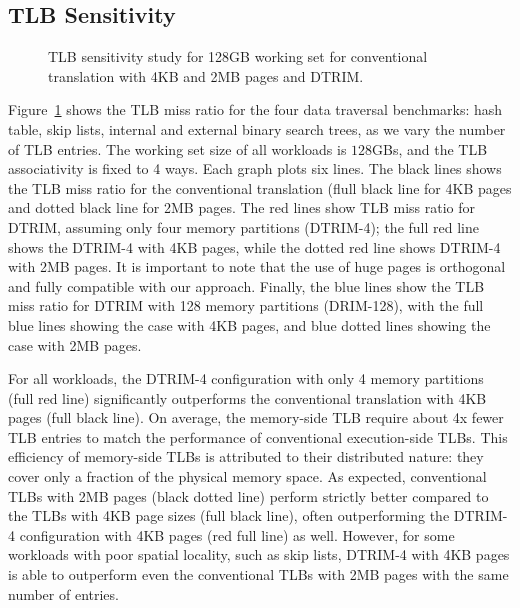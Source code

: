 \subsection{TLB Sensitivity}
\begin{figure}[t]
    \centering
    \caption{TLB sensitivity study for 128GB working set for conventional translation with 4KB and 2MB pages and DTRIM.}
    \label{fig:miss_ratio_128GB}
\end{figure}
Figure~\ref{fig:miss_ratio_128GB} shows the TLB miss ratio for the four data traversal benchmarks: hash table, skip lists, internal and external binary search trees, as we vary the number of TLB entries. The working set size of all workloads is $128$GBs, and the TLB associativity is fixed to 4 ways. Each graph plots six lines. The black lines shows the TLB miss ratio for the conventional translation (flull black line for 4KB pages and dotted black line for 2MB pages. The red lines show TLB miss ratio for DTRIM, assuming only four memory partitions (DTRIM-4); the full red line shows the DTRIM-4 with 4KB pages, while the dotted red line shows DTRIM-4 with 2MB pages. It is important to note that the use of huge pages is orthogonal and fully compatible with our approach. Finally, the blue lines show the TLB miss ratio for DTRIM with 128 memory partitions (DRIM-128), with the full blue lines showing the case with 4KB pages, and blue dotted lines showing the case with 2MB pages. 

For all workloads, the DTRIM-4 configuration with only 4 memory partitions (full red line) significantly outperforms the conventional translation with 4KB pages (full black line). On average, the memory-side TLB require about 4x fewer TLB entries to match the performance of conventional execution-side TLBs. This efficiency of memory-side TLBs is attributed to their distributed nature: they cover only a fraction of the physical memory space. As expected, conventional TLBs with 2MB pages (black dotted line) perform strictly better compared to the TLBs with 4KB page sizes (full black line), often outperforming the DTRIM-4 configuration with 4KB pages (red full line) as well. However, for some workloads with poor spatial locality, such as skip lists, DTRIM-4 with 4KB pages is able to outperform even the conventional TLBs with 2MB pages with the same number of entries. 

